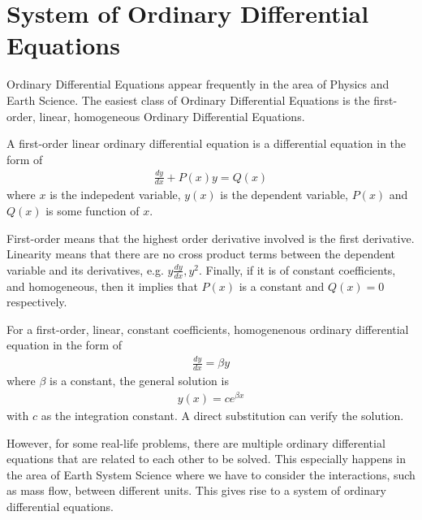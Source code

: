 \section{System of Ordinary Differential Equations}
Ordinary Differential Equations appear frequently in the area of Physics and Earth Science. The easiest class of Ordinary Differential Equations is the first-order, linear, homogeneous Ordinary Differential Equations.
\begin{defn}
A first-order linear ordinary differential equation is a differential equation in the form of
\begin{align*}
\frac{dy}{dx} + P(x)y = Q(x)
\end{align*}
where $x$ is the indepedent variable, $y(x)$ is the dependent variable, $P(x)$ and $Q(x)$ is some function of $x$. 
\end{defn}
First-order means that the highest order derivative involved is the first derivative. Linearity means that there are no cross product terms between the dependent variable and its derivatives, e.g. $y\frac{dy}{dx}, y^2$. Finally, if it is of constant coefficients, and homogeneous, then it implies that $P(x)$ is a constant and $Q(x) = 0$ respectively.
\begin{thm}
\label{ODEsol}
For a first-order, linear, constant coefficients, homogenenous ordinary differential equation in the form of
\begin{align*}
\frac{dy}{dx} = \beta y
\end{align*}
where $\beta$ is a constant, the general solution is
\begin{align*}
y(x) = ce^{\beta x}
\end{align*}
with $c$ as the integration constant. A direct substitution can verify the solution.
\end{thm}
However, for some real-life problems, there are multiple ordinary differential equations that are related to each other to be solved. This especially happens in the area of Earth System Science where we have to consider the interactions, such as mass flow, between different units. This gives rise to a system of ordinary differential equations.
